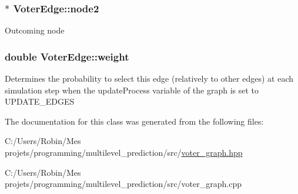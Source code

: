 \subsubsection[{node2}]{$\ast$ Voter\+Edge\+::node2}\label{class_voter_edge_a2483bd0524c590213c0abd33f7a5de2b}
Outcoming node \hypertarget{class_voter_edge_a08b1042475d9628a0da0e7ebf8557923}{}
\subsubsection[{weight}]{\setlength{\rightskip}{0pt plus 5cm}double Voter\+Edge\+::weight}\label{class_voter_edge_a08b1042475d9628a0da0e7ebf8557923}
Determines the probability to select this edge (relatively to other edges) at each simulation step when the update\+Process variable of the graph is set to U\+P\+D\+A\+T\+E\+\_\+\+E\+D\+G\+E\+S 

The documentation for this class was generated from the following files\+:\begin{DoxyCompactItemize}
\item 
C\+:/\+Users/\+Robin/\+Mes projets/programming/multilevel\+\_\+prediction/src/\hyperlink{voter__graph_8hpp}{voter\+\_\+graph.\+hpp}\item 
C\+:/\+Users/\+Robin/\+Mes projets/programming/multilevel\+\_\+prediction/src/voter\+\_\+graph.\+cpp\end{DoxyCompactItemize}

